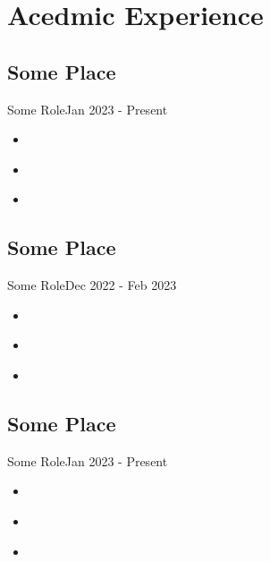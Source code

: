 \section{Acedmic Experience}
\subsection{Some Place}{Some Role}{Jan 2023 - Present}
\begin{itemize}
    \item \lipsum[2][2] \textbf{\lipsum[4][1]}  
    \item \lipsum[3][1] \textbf{\lipsum[1][1]}  
    \item \textbf{\lipsum[2][2]} \lipsum[4][1]   
\end{itemize}
\subsection{Some Place}{Some Role}{Dec 2022 - Feb 2023}
\begin{itemize}
    \item \lipsum[2][2] \textbf{\lipsum[4][1]}  
    \item \lipsum[3][1] \textbf{\lipsum[1][1]}  
    \item \textbf{\lipsum[2][2]} \lipsum[4][1]   
\end{itemize}\subsection{Some Place}{Some Role}{Jan 2023 - Present}
\begin{itemize}
    \item \lipsum[2][2] \textbf{\lipsum[4][1]}  
    \item \lipsum[3][1] \textbf{\lipsum[1][1]}  
    \item \textbf{\lipsum[2][2]} \lipsum[4][1]   
\end{itemize}